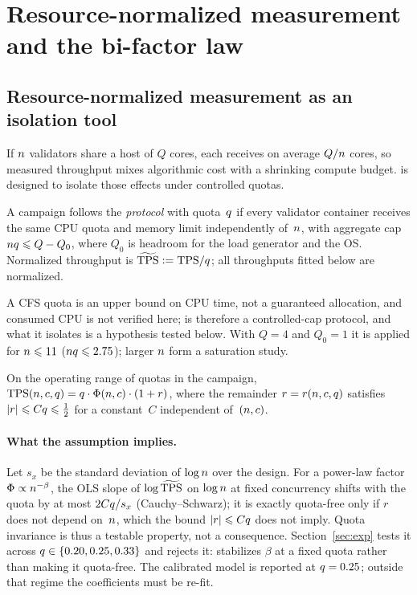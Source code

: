 \section{Resource-normalized measurement and the bi-factor law}
\label{sec:model}

\subsection{Resource-normalized measurement as an isolation tool}

If $n$ validators share a host of $Q$ cores, each receives on average $Q/n$
cores, so measured throughput mixes algorithmic cost with a shrinking compute
budget. \RNM{} is designed to isolate those effects under controlled quotas.

\begin{Def}
\label{def:rnm}
A campaign follows the \emph{\RNM{} protocol} with quota~$q$ if every validator
container receives the same CPU quota and memory limit independently of~$n$,
with aggregate cap $nq\leqslant Q-Q_{0}$, where $Q_{0}$ is headroom for the load
generator and the OS. Normalized throughput is $\widetilde{\mathrm{TPS}}\mathrel{\mathop:}=\mathrm{TPS}/q$; all
throughputs fitted below are normalized.
\end{Def}

A CFS quota is an upper bound on CPU time, not a guaranteed allocation, and
consumed CPU is not verified here; \RNM{} is therefore a controlled-cap
protocol, and what it isolates is a hypothesis tested below. With $Q=4$ and
$Q_{0}=1$ it is applied for $n\leqslant11$ ($nq\leqslant2.75$); larger
$n$ form a saturation study.

\begin{Assumption}
\label{as:separable}
On the operating range of quotas in the campaign,
$\mathrm{TPS}(n,c,q)=q\cdot\Phi(n,c)\cdot(1+r)$, where the remainder
$r=r(n,c,q)$ satisfies $|r|\leqslant Cq\leqslant\tfrac12$ for a
constant~$C$ independent of~$(n,c)$.
\end{Assumption}

\paragraph{What the assumption implies.}
Let $s_x$ be the standard deviation of $\log n$ over the design. For a power-law
factor $\Phi\propto n^{-\beta}$, the OLS slope of $\log\widetilde{\mathrm{TPS}}$ on $\log n$ at
fixed concurrency shifts with the quota by at most $2Cq/s_x$
(Cauchy--Schwarz); it is exactly quota-free only if $r$ does not depend
on~$n$, which the bound $|r|\leqslant Cq$ does not imply. Quota invariance is thus
a testable property, not a consequence. Section~\ref{sec:exp} tests it across
$q\in\{0.20,0.25,0.33\}$ and rejects it: \RNM{} stabilizes
$\beta$ at a fixed quota rather than making it quota-free. The calibrated model
is reported at $q=0.25$; outside that regime the coefficients must be re-fit.

